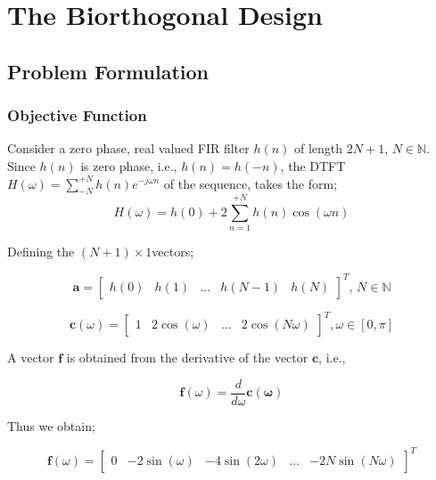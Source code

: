 \chapter{The Biorthogonal Design}
\section{\label{sec:problem_formulation}Problem Formulation}
\subsection{\label{sub:objective function}Objective Function}
Consider a zero phase, real valued FIR filter $h(n)$ of length
$2N+1$, $N\in\mathbb{N}$. Since $h(n)$ is zero phase, i.e., $h(n)=h(-n)$,
the DTFT $H(\omega)=\sum_{-N}^{+N}h(n)e^{-j\omega n}$ of the sequence,
takes the form;
\begin{equation}
H(\omega)=h(0)+2\sum_{n=1}^{+N}h(n)\cos(\omega n)\label{eq:frequencyResponse}\end{equation}


Defining the $(N+1)\times 1$vectors;

\begin{equation}
\mathbf{a}=\left[\begin{array}{ccccc}
h(0) & h(1) & \ldots & h(N-1) & h(N)\end{array}\right]^{T},\, N\in\mathbb{N}\label{eq:halfLengthFilterVector}\end{equation}


\begin{equation}
\mathbf{c}(\omega)=\left[\begin{array}{ccccc}
1 & 2\cos(\omega) & \ldots & 2\cos(N\omega)\end{array}\right]^{T},\omega\in[0,\pi]\label{eq:CosVector}\end{equation}


A vector \textbf{$\mathbf{f}$} is obtained from the derivative of
the vector $\mathbf{c}$, i.e.,

\[
\mathbf{f}(\omega)=\frac{d}{d\omega}\mathbf{c(\omega)}\]


Thus we obtain;

\begin{equation}
\mathbf{f}(\omega)=\left[\begin{array}{ccccc}
0 & -2\sin(\omega) & -4\sin(2\omega) & \ldots & -2N\sin(N\omega)\end{array}\right]^{T}\label{eq:SineVector}\end{equation}


